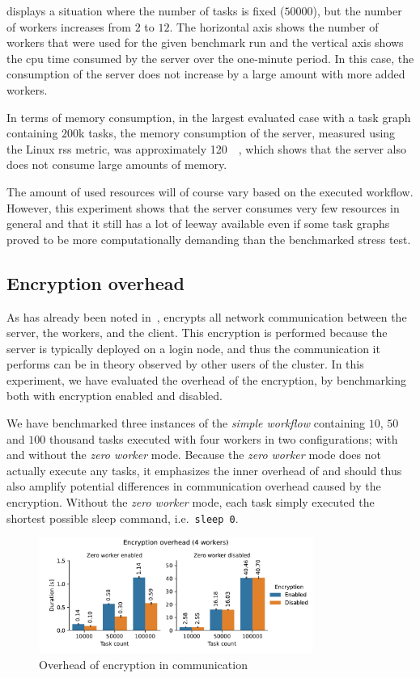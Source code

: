  displays a situation where the number of tasks
is fixed ($50000$), but the number of workers increases from
$2$ to $12$. The horizontal axis shows the number of workers
that were used for the given benchmark run and the vertical axis shows the \gls{cpu}
time consumed by the server over the one-minute period. In this case, the consumption of the server
does not increase by a large amount with more added workers.

In terms of memory consumption, in the largest evaluated case with a task graph containing
$200$k tasks, the memory consumption of the server, measured using the Linux
\gls{rss} metric, was approximately \SI{120}{\mebi\byte}, which shows that the server
also does not consume large amounts of memory.

The amount of used resources will of course vary based on the executed workflow. However, this
experiment shows that the server consumes very few resources in general and that it still has a
lot of leeway available even if some task graphs proved to be more computationally demanding than
the benchmarked stress test.

\subsection{Encryption overhead}
\label{sec:hq-exp-encryption-overhead}
As has already been noted in~, \hyperqueue{} encrypts all network
communication between the server, the workers, and the client. This encryption is performed because
the server is typically deployed on a login node, and thus the communication it performs can be in
theory observed by other users of the cluster. In this experiment, we have evaluated the overhead
of the encryption, by benchmarking \hyperqueue{} both with encryption enabled and
disabled.

We have benchmarked three instances of the \emph{simple workflow} containing
$10$, $50$ and $100$ thousand tasks executed
with four \hyperqueue{} workers in two configurations; with and without the
\emph{zero worker} mode. Because the \emph{zero worker} mode does not actually execute
any tasks, it emphasizes the inner overhead of \hyperqueue{} and should thus also amplify
potential differences in communication overhead caused by the encryption. Without the
\emph{zero worker} mode, each task simply executed the shortest possible sleep command, i.e.\
\texttt{sleep 0}.

\begin{figure}[h]
	\centering
	\includegraphics[width=0.8\textwidth]{imgs/hq/charts/encryption-overhead}
	\caption{Overhead of encryption in \hyperqueue{} communication}
	\label{fig:hq-encryption-overhead}
\end{figure}

